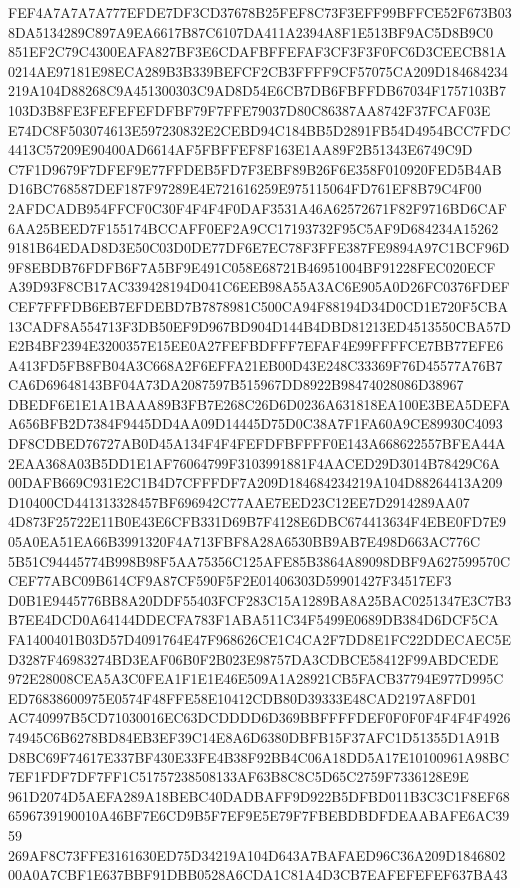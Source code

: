 \documentclass[UTF8,fontset=fandol,zihao=-4,a4paper]{ctexart}
\begin{document}
{{FEF4A7A7A7A777EFDE7DF3CD37678B25FEF8C73F3EFF99BFFCE52F673B038DA5134289C897A9EA6617B87C6107DA411A2394A8F1E513BF9AC5D8B9C0
851EF2C79C4300EAFA827BF3E6CDAFBFFEFAF3CF3F3F0FC6D3CEECB81A0214AE97181E98ECA289B3B339BEFCF2CB3FFFF9CF57075CA209D184684234
219A104D88268C9A451300303C9AD8D54E6CB7DB6FBFFDB67034F1757103B7103D3B8FE3FEFEFEFDFBF79F7FFE79037D80C86387AA8742F37FCAF03E
E74DC8F503074613E597230832E2CEBD94C184BB5D2891FB54D4954BCC7FDC4413C57209E90400AD6614AF5FBFFEF8F163E1AA89F2B51343E6749C9D
C7F1D9679F7DFEF9E77FFDEB5FD7F3EBF89B26F6E358F010920FED5B4ABD16BC768587DEF187F97289E4E721616259E975115064FD761EF8B79C4F00
2AFDCADB954FFCF0C30F4F4F4F0DAF3531A46A62572671F82F9716BD6CAF6AA25BEED7F155174BCCAFF0EF2A9CC17193732F95C5AF9D684234A15262
9181B64EDAD8D3E50C03D0DE77DF6E7EC78F3FFE387FE9894A97C1BCF96D9F8EBDB76FDFB6F7A5BF9E491C058E68721B46951004BF91228FEC020ECF
A39D93F8CB17AC339428194D041C6EEB98A55A3AC6E905A0D26FC0376FDEFCEF7FFFDB6EB7EFDEBD7B7878981C500CA94F88194D34D0CD1E720F5CBA
13CADF8A554713F3DB50EF9D967BD904D144B4DBD81213ED4513550CBA57DE2B4BF2394E3200357E15EE0A27FEFBDFFF7EFAF4E99FFFFCE7BB77EFE6
A413FD5FB8FB04A3C668A2F6EFFA21EB00D43E248C33369F76D45577A76B7CA6D69648143BF04A73DA2087597B515967DD8922B98474028086D38967
DBEDF6E1E1A1BAAA89B3FB7E268C26D6D0236A631818EA100E3BEA5DEFAA656BFB2D7384F9445DD4AA09D14445D75D0C38A7F1FA60A9CE89930C4093
DF8CDBED76727AB0D45A134F4F4FEFDFBFFFF0E143A668622557BFEA44A2EAA368A03B5DD1E1AF76064799F3103991881F4AACED29D3014B78429C6A
00DAFB669C931E2C1B4D7CFFFDF7A209D184684234219A104D88264413A209D10400CD441313328457BF696942C77AAE7EED23C12EE7D2914289AA07
4D873F25722E11B0E43E6CFB331D69B7F4128E6DBC674413634F4EBE0FD7E905A0EA51EA66B3991320F4A713FBF8A28A6530BB9AB7E498D663AC776C
5B51C94445774B998B98F5AA75356C125AFE85B3864A89098DBF9A627599570CCEF77ABC09B614CF9A87CF590F5F2E01406303D59901427F34517EF3
D0B1E9445776BB8A20DDF55403FCF283C15A1289BA8A25BAC0251347E3C7B3B7EE4DCD0A64144DDECFA783F1ABA511C34F5499E0689DB384D6DCF5CA
FA1400401B03D57D4091764E47F968626CE1C4CA2F7DD8E1FC22DDECAEC5ED3287F46983274BD3EAF06B0F2B023E98757DA3CDBCE58412F99ABDCEDE
972E28008CEA5A3C0FEA1F1E1E46E509A1A28921CB5FACB37794E977D995CED76838600975E0574F48FFE58E10412CDB80D39333E48CAD2197A8FD01
AC740997B5CD71030016EC63DCDDDD6D369BBFFFFDEF0F0F0F4F4F4F492674945C6B6278BD84EB3EF39C14E8A6D6380DBFB15F37AFC1D51355D1A91B
D8BC69F74617E337BF430E33FE4B38F92BB4C06A18DD5A17E10100961A98BC7EF1FDF7DF7FF1C51757238508133AF63B8C8C5D65C2759F7336128E9E
961D2074D5AEFA289A18BEBC40DADBAFF9D922B5DFBD011B3C3C1F8EF686596739190010A46BF7E6CD9B5F7EF9E5E79F7FBEBDBDFDEAABAFE6AC3959
269AF8C73FFE3161630ED75D34219A104D643A7BAFAED96C36A209D184680200A0A7CBF1E637BBF91DBB0528A6CDA1C81A4D3CB7EAFEFEFEF637BA43
}}
\end{document}
